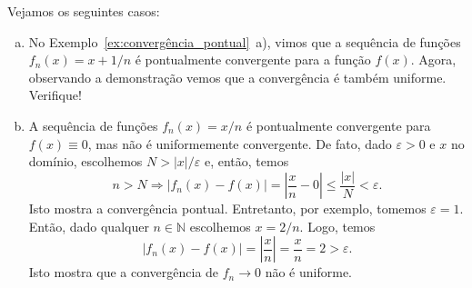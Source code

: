 \begin{ex}\label{ex:convergência_uniforme}
  Vejamos os seguintes casos:
  \begin{enumerate}[a)] 
  \item No Exemplo~\ref{ex:convergência_pontual}~a), vimos que a
    sequência de funções $f_n(x) = x + 1/n$ é pontualmente convergente
    para a função $f(x)$. Agora, observando a demonstração vemos que a
    convergência é também uniforme. Verifique!
  \item A sequência de funções $f_n(x) = x/n$ é pontualmente
    convergente para $f(x)\equiv 0$, mas não é uniformemente
    convergente. De fato, dado $\varepsilon>0$ e $x$ no domínio,
    escolhemos $N>|x|/\varepsilon$ e, então, temos
    \begin{equation}
      n>N \Rightarrow |f_n(x) - f(x)| = \left|\frac{x}{n}-0\right|\leq \frac{|x|}{N} < \varepsilon.
    \end{equation}
    Isto mostra a convergência pontual. Entretanto, por exemplo,
    tomemos $\varepsilon=1$. Então, dado qualquer $n\in \mathbb{N}$
    escolhemos $x=2/n$. Logo, temos
    \begin{equation}
      |f_n(x) - f(x)| = \left|\frac{x}{n}\right| = \frac{x}{n} = 2 > \varepsilon.
    \end{equation}
    Isto mostra que a convergência de $f_n\to 0$ não é uniforme.
  \end{enumerate}
\end{ex}


